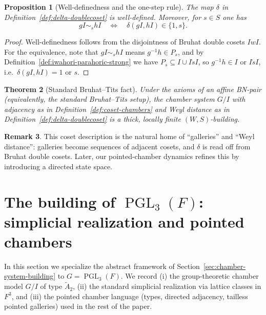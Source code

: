 \documentclass[11pt]{amsart}
\newtheorem{thm}{Theorem}[section]
\newtheorem{proposition}[thm]{Proposition}
\theoremstyle{definition}
\newtheorem{remark}[thm]{Remark}
\theoremstyle{remark}
\numberwithin{equation}{section}
\begin{document}
\begin{proposition}[Well-definedness and the one-step rule]\label{prop:delta-well-defined}
The map $\delta$ in Definition~\ref{def:delta-doublecoset} is well-defined.
Moreover, for $s\in S$ one has
\[
gI\sim_s hI \quad\Longleftrightarrow\quad \delta(gI,hI)\in\{1,s\}.
\]
\end{proposition}

\begin{proof}
Well-definedness follows from the disjointness of Bruhat double cosets $IwI$.
For the equivalence, note that $gI\sim_s hI$ means $g^{-1}h\in P_s$, and by
Definition~\ref{def:iwahori-parahoric-strong} we have $P_s\subseteq I\cup I\dot{s}I$,
so $g^{-1}h\in I$ or $I\dot{s}I$, i.e.\ $\delta(gI,hI)=1$ or $s$.
\end{proof}

\begin{thm}[Standard Bruhat--Tits fact]\label{thm:coset-building}
Under the axioms of an affine BN-pair (equivalently, the standard Bruhat--Tits setup),
the chamber system $G/I$ with adjacency as in Definition~\ref{def:coset-chambers}
and Weyl distance as in Definition~\ref{def:delta-doublecoset} is a thick, locally finite $(W,S)$-building.
\end{thm}

\begin{remark}\label{rem:why-this-matters}
This coset description is the natural home of ``galleries'' and ``Weyl distance'':
galleries become sequences of adjacent cosets, and $\delta$ is read off from Bruhat double cosets.
Later, our pointed-chamber dynamics refines this by introducing a directed state space.
\end{remark}



\section{The building of \texorpdfstring{$\operatorname{PGL}_3(F)$}{PGL3(F)}: simplicial realization and pointed chambers}\label{sec:pgl3-building-pointed}

In this section we specialize the abstract framework of Section~\ref{sec:chamber-system-building} to
$G=\operatorname{PGL}_3(F)$.
We record (i) the group-theoretic chamber model $G/I$ of type $\widetilde{A}_2$,
(ii) the standard simplicial realization via lattice classes in $F^3$,
and (iii) the pointed chamber language (types, directed adjacency, tailless pointed galleries)
used in the rest of the paper.
\end{document}
